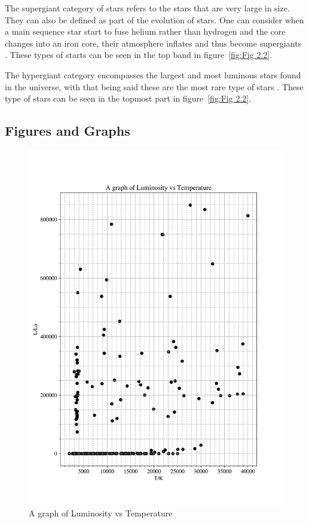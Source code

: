 \documentclass[12pt, a4paper]{article}
\begin{document}
The supergiant category of stars refers to the stars that are very large in size. They can also be defined as part of the evolution of stars. One can consider when a main sequence star start to fuse helium rather than hydrogen and the core changes into an iron core, their atmosphere inflates and thus become supergiants \parencite{jaschek1990classification}. These types of starts can be seen in the top band in figure~\ref{fig:Fig 2.2}.

The hypergiant category encompasses the largest and most luminous stars found in the universe, with that being said these are the most rare type of stars \parencite{jaschek1990classification}. These type of stars can be seen in the topmost part in figure~\ref{fig:Fig 2.2}.

\subsection{Figures and Graphs}
\begin{figure}[H]
    \centering
    \includegraphics[width = \textwidth]{2Plot1.png}
    \caption{A graph of Luminosity vs Temperature}
    \label{fig:Fig 2.1}
\end{figure}
\end{document}

